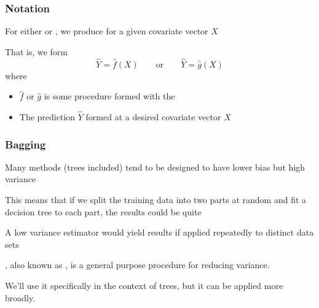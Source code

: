 \documentclass[12pt]{beamer}
\begin{document}
\title{}
\subtitle{\classTitle}
\date{}



\begin{frame}
\maketitle

\organization
%
\end{frame}

\begin{frame}[fragile]
\frametitle{Notation}
 For either  or , we produce 
for a given covariate vector $X$

\vsp
That is, we form
\[
\hat{Y} =  \hat{f}(X) \qquad \textrm{or} \qquad \hat{Y} =  \hat{g}(X)
\]
where
\begin{itemize}
\item $\hat{f}$ or $\hat{g}$ is some procedure formed with the 

\item The prediction $\hat{Y}$ formed at a desired covariate vector $X$


\end{itemize}
\end{frame}

\begin{frame}[fragile]
\frametitle{Bagging}
Many methods (trees included) tend to be designed to have lower bias but high variance

\vsp
This means
that if we split the training data into two parts at random and fit a decision tree to each part, the results could be quite 

\vsp
A low variance estimator would yield  results if applied repeatedly to distinct data sets 


\vsp
{}, also known as , is a general purpose procedure for reducing variance. 

\vsp
We'll use it specifically in the context of trees, but it can be applied more broadly.
\end{frame}
\end{document}
